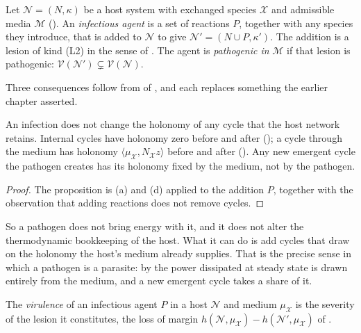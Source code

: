 \begin{definition}[Infection]
\label{sm:def-infection}
Let $\mathcal N=(N,\kappa)$ be a host system with exchanged species
$\mathcal X$ and admissible media $\mathcal M$
(). An \emph{infectious agent} is a set of reactions
$P$, together with any species they introduce, that is added to
$\mathcal N$ to give $\mathcal N'=(N\cup P,\kappa')$. The addition is a
lesion of kind (L2) in the sense of . The agent is
\emph{pathogenic in} $\mathcal M$ if that lesion is pathogenic:
$\mathcal V(\mathcal N')\subsetneq\mathcal V(\mathcal N)$.
\end{definition}

Three consequences follow from 
of , and each replaces something the earlier
chapter asserted.

\begin{proposition}
\label{sm:prop-no-holonomy}
\lnkD{} An infection does not change the holonomy of any cycle that the
host network retains. Internal cycles have holonomy zero before and after
(); a cycle through the medium has holonomy
$\langle\mu_{\mathcal X},N_{\mathcal X}z\rangle$ before and after
(). Any new emergent cycle the pathogen creates has its
holonomy fixed by the medium, not by the pathogen.
\end{proposition}

\begin{proof}
The proposition is (a) and (d) applied to the addition
$P$, together with the observation that adding reactions does not remove
cycles.
\end{proof}

So a pathogen does not bring energy with it, and it does not alter the
thermodynamic bookkeeping of the host. What it can do is add cycles that
draw on the holonomy the host's medium already supplies. That is the precise
sense in which a pathogen is a parasite: by  the power
dissipated at steady state is drawn entirely from the medium, and a new
emergent cycle takes a share of it.

\begin{definition}[Virulence]
\label{sm:def-virulence}
The \emph{virulence} of an infectious agent $P$ in a host $\mathcal N$ and
medium $\mu_{\mathcal X}$ is the severity of the lesion it constitutes, the
loss of margin $h(\mathcal N,\mu_{\mathcal X})-h(\mathcal N',
\mu_{\mathcal X})$ of .
\end{definition}

